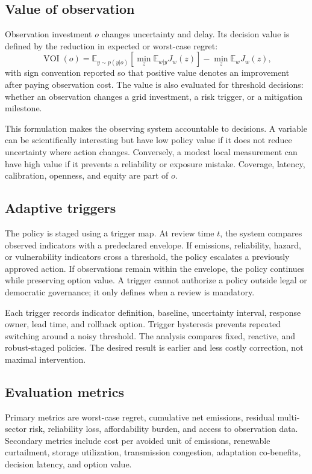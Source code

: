 \documentclass[conference]{IEEEtran}
\begin{document}
\subsection{Value of observation}
Observation investment $o$ changes uncertainty and delay. Its decision value is defined by the reduction in expected or worst-case regret:
\begin{equation}
\operatorname{VOI}(o)=
\mathbb{E}_{y\sim p(y|o)}
\left[\min_z \mathbb{E}_{w|y}J_w(z)\right]
-\min_z \mathbb{E}_{w}J_w(z),
\label{eq:voi}
\end{equation}
with sign convention reported so that positive value denotes an improvement after paying observation cost. The value is also evaluated for threshold decisions: whether an observation changes a grid investment, a risk trigger, or a mitigation milestone.

This formulation makes the observing system accountable to decisions. A variable can be scientifically interesting but have low policy value if it does not reduce uncertainty where action changes. Conversely, a modest local measurement can have high value if it prevents a reliability or exposure mistake. Coverage, latency, calibration, openness, and equity are part of $o$.

\subsection{Adaptive triggers}
The policy is staged using a trigger map. At review time $t$, the system compares observed indicators with a predeclared envelope. If emissions, reliability, hazard, or vulnerability indicators cross a threshold, the policy escalates a previously approved action. If observations remain within the envelope, the policy continues while preserving option value. A trigger cannot authorize a policy outside legal or democratic governance; it only defines when a review is mandatory.

Each trigger records indicator definition, baseline, uncertainty interval, response owner, lead time, and rollback option. Trigger hysteresis prevents repeated switching around a noisy threshold. The analysis compares fixed, reactive, and robust-staged policies. The desired result is earlier and less costly correction, not maximal intervention.

\subsection{Evaluation metrics}
Primary metrics are worst-case regret, cumulative net emissions, residual multi-sector risk, reliability loss, affordability burden, and access to observation data. Secondary metrics include cost per avoided unit of emissions, renewable curtailment, storage utilization, transmission congestion, adaptation co-benefits, decision latency, and option value.
\end{document}
